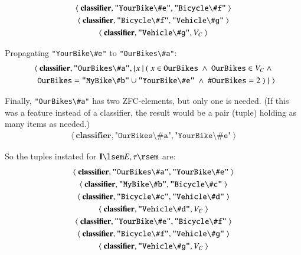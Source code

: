 \begin{gather}
\langle~\textbf{classifier},\texttt{"YourBike\textbackslash\#e"},\texttt{"Bicycle\textbackslash\#f"}~\rangle \notag \\
\langle~\textbf{classifier},\texttt{"Bicycle\textbackslash\#f"},\texttt{"Vehicle\textbackslash\#g"}~\rangle \notag \\
\langle~\textbf{classifier},\texttt{"Vehicle\textbackslash\#g"},V_C~\rangle \notag \\
\end{gather}

Propagating \texttt{"YourBike\textbackslash\#e"} to \texttt{"OurBikes\textbackslash\#a"}:
\begin{gather}
\langle~\textbf{classifier},\texttt{"OurBikes\textbackslash\#a"}, \{x~\vert ~(~ x \in \texttt{OurBikes}~\wedge~\texttt{OurBikes}\in V_C~ \wedge \notag \\
 ~~~  \texttt{OurBikes}=\texttt{"MyBike\textbackslash\#b"}\cup\texttt{"YourBike\textbackslash\#e"}~\wedge~\#\texttt{OurBikes}=2~)~\}~\rangle
\end{gather}

Finally, \texttt{"OurBikes\textbackslash\#a"} has two ZFC-elements, but only one is needed.  (If this was a feature instead of a classifier, the result would be a pair (tuple) holding as many items as needed.)
\begin{gather}
\langle~\textbf{classifier},\texttt{"OurBikes\textbackslash\#a"}, \texttt{"YourBike\textbackslash\#e"}~\rangle
\end{gather}

So the tuples instated for $\mathbf{I}\lsem E,\tau\rsem$ are:
\begin{gather}
\langle~\textbf{classifier},\texttt{"OurBikes\textbackslash\#a"}, \texttt{"YourBike\textbackslash\#e"}~\rangle \notag \\
\langle~\textbf{classifier},\texttt{"MyBike\textbackslash\#b"},\texttt{"Bicycle\textbackslash\#c"}~\rangle \notag \\
\langle~\textbf{classifier},\texttt{"Bicycle\textbackslash\#c"},\texttt{"Vehicle\textbackslash\#d"}~\rangle \notag \\
\langle~\textbf{classifier},\texttt{"Vehicle\textbackslash\#d"},V_C~\rangle \notag \\
\langle~\textbf{classifier},\texttt{"YourBike\textbackslash\#e"},\texttt{"Bicycle\textbackslash\#f"}~\rangle \notag \\
\langle~\textbf{classifier},\texttt{"Bicycle\textbackslash\#f"},\texttt{"Vehicle\textbackslash\#g"}~\rangle \notag \\
\langle~\textbf{classifier},\texttt{"Vehicle\textbackslash\#g"},V_C~\rangle \notag \\
\end{gather}

